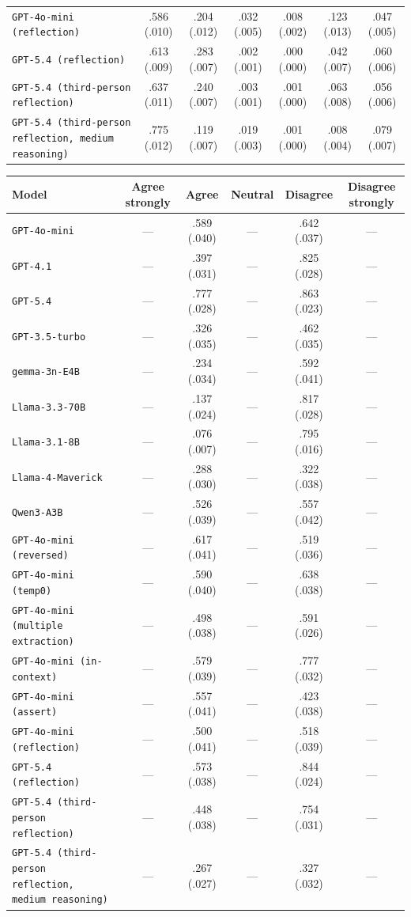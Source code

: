 \begin{tabular}{lcccccc}
		\texttt{GPT-4o-mini (reflection)} & .586 (.010) & .204 (.012) & .032 (.005) & .008 (.002) & .123 (.013) & .047 (.005) \\
		\texttt{GPT-5.4 (reflection)} & .613 (.009) & .283 (.007) & .002 (.001) & .000 (.000) & .042 (.007) & .060 (.006) \\
		\texttt{GPT-5.4 (third-person reflection)} & .637 (.011) & .240 (.007) & .003 (.001) & .001 (.000) & .063 (.008) & .056 (.006) \\
		\texttt{GPT-5.4 (third-person reflection, medium reasoning)} & .775 (.012) & .119 (.007) & .019 (.003) & .001 (.000) & .008 (.004) & .079 (.007) \\
		\hline
\end{tabular}


\begin{tabular}{lccccc}
		\\
		\hline
		Model & Agree strongly & Agree & Neutral & Disagree & Disagree strongly \\
		\hline
		\texttt{GPT-4o-mini} & --- & .589 (.040) & --- & .642 (.037) & --- \\
		\texttt{GPT-4.1} & --- & .397 (.031) & --- & .825 (.028) & --- \\
		\texttt{GPT-5.4} & --- & .777 (.028) & --- & .863 (.023) & --- \\
		\texttt{GPT-3.5-turbo} & --- & .326 (.035) & --- & .462 (.035) & --- \\
		\texttt{gemma-3n-E4B} & --- & .234 (.034) & --- & .592 (.041) & --- \\
		\texttt{Llama-3.3-70B} & --- & .137 (.024) & --- & .817 (.028) & --- \\
		\texttt{Llama-3.1-8B} & --- & .076 (.007) & --- & .795 (.016) & --- \\
		\texttt{Llama-4-Maverick} & --- & .288 (.030) & --- & .322 (.038) & --- \\
		\texttt{Qwen3-A3B} & --- & .526 (.039) & --- & .557 (.042) & --- \\
		\texttt{GPT-4o-mini (reversed)} & --- & .617 (.041) & --- & .519 (.036) & --- \\
		\texttt{GPT-4o-mini (temp0)} & --- & .590 (.040) & --- & .638 (.038) & --- \\
		\texttt{GPT-4o-mini (multiple extraction)} & --- & .498 (.038) & --- & .591 (.026) & --- \\
		\texttt{GPT-4o-mini (in-context)} & --- & .579 (.039) & --- & .777 (.032) & --- \\
		\texttt{GPT-4o-mini (assert)} & --- & .557 (.041) & --- & .423 (.038) & --- \\
		\texttt{GPT-4o-mini (reflection)} & --- & .500 (.041) & --- & .518 (.039) & --- \\
		\texttt{GPT-5.4 (reflection)} & --- & .573 (.038) & --- & .844 (.024) & --- \\
		\texttt{GPT-5.4 (third-person reflection)} & --- & .448 (.038) & --- & .754 (.031) & --- \\
		\texttt{GPT-5.4 (third-person reflection, medium reasoning)} & --- & .267 (.027) & --- & .327 (.032) & --- \\
		\hline
\end{tabular}


